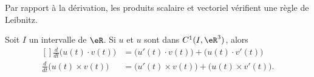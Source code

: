 Par rapport à la dérivation, les produits scalaire et vectoriel vérifient une règle de Leibnitz.
\begin{proposition}     \label{PROPooFKKHooQZGXhE}
	Soit \( I\) un intervalle de \( \eR\). Si \( u\) et \( u\) sont dans \( C^1(I,\eR^3)\), alors
	\begin{equation}		\label{EqFormLeibProdscalVect}
		\begin{aligned}[]
			\frac{ d }{ dt }\big( u(t)\cdot v(t) \big)  & =\big( u'(t)\cdot v(t) \big)+\big( u(t)\cdot v'(t) \big)    \\
			\frac{ d }{ dt }\big( u(t)\times v(t) \big) & =\big( u'(t)\times v(t) \big)+\big( u(t)\times v'(t) \big).
		\end{aligned}
	\end{equation}
\end{proposition}


